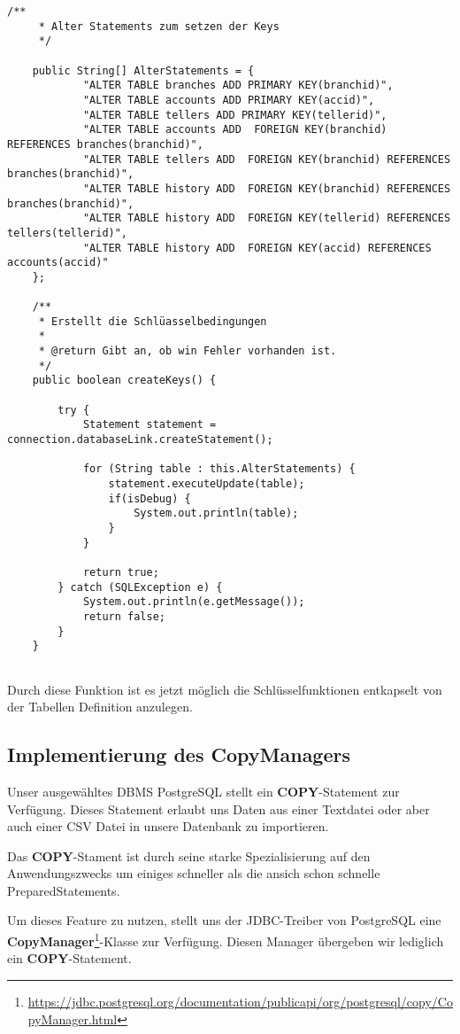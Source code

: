 \begin{lstlisting}[caption={Alter Statements \& Funktion createKeys}]
	/**
	 * Alter Statements zum setzen der Keys
	 */
	
	public String[] AlterStatements = {
			"ALTER TABLE branches ADD PRIMARY KEY(branchid)",
			"ALTER TABLE accounts ADD PRIMARY KEY(accid)",
			"ALTER TABLE tellers ADD PRIMARY KEY(tellerid)",
			"ALTER TABLE accounts ADD  FOREIGN KEY(branchid) REFERENCES branches(branchid)",
			"ALTER TABLE tellers ADD  FOREIGN KEY(branchid) REFERENCES branches(branchid)",
			"ALTER TABLE history ADD  FOREIGN KEY(branchid) REFERENCES branches(branchid)",
			"ALTER TABLE history ADD  FOREIGN KEY(tellerid) REFERENCES tellers(tellerid)",
			"ALTER TABLE history ADD  FOREIGN KEY(accid) REFERENCES accounts(accid)"
	};
	
	/**
	 * Erstellt die Schlüasselbedingungen
	 * 
	 * @return Gibt an, ob win Fehler vorhanden ist.
	 */
	public boolean createKeys() {
	
		try {
			Statement statement = connection.databaseLink.createStatement();

			for (String table : this.AlterStatements) {
				statement.executeUpdate(table);
				if(isDebug) {
					System.out.println(table);
				}
			}

			return true;
		} catch (SQLException e) {
			System.out.println(e.getMessage());
			return false;
		}
	}
		
\end{lstlisting}

Durch diese Funktion ist es jetzt möglich die Schlüsselfunktionen entkapselt von
der Tabellen Definition anzulegen.


\subsection{Implementierung des CopyManagers}
Unser ausgewähltes DBMS PostgreSQL stellt ein \textbf{COPY}-Statement zur
Verfügung. Dieses Statement erlaubt uns Daten aus einer Textdatei oder aber auch
einer CSV Datei in unsere Datenbank zu importieren. 

Das \textbf{COPY}-Stament ist durch seine starke Spezialisierung auf den
Anwendungszwecks um einiges schneller als die ansich schon schnelle
PreparedStatements.

Um dieses Feature zu nutzen, stellt uns der JDBC-Treiber von PostgreSQL eine
\textbf{CopyManager}\footnote{\url{https://jdbc.postgresql.org/documentation/publicapi/org/postgresql/copy/CopyManager.html}}-Klasse
zur Verfügung. Diesen Manager übergeben wir lediglich ein
\textbf{COPY}-Statement.

